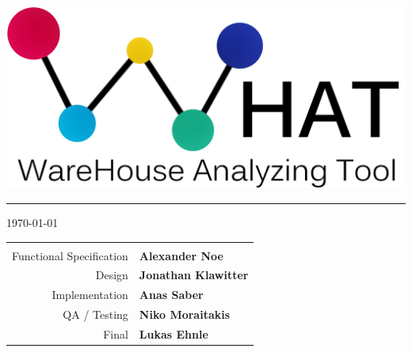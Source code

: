 \begin{titlepage}
\begin{center}
\begin{center}
   \includegraphics[width=0.7\linewidth]{Pictures/WHAT-LogoText2.png}
   
\end{center} 


\vspace*{2.8cm}

{\color{Bittersweet}\hrule}
\vspace*{0.4cm}
 {\today}
 
\vspace*{0.5cm}
\normalsize

 

\begin{tabular}{r l}

\arrayrulecolor{Bittersweet!90}
\hline
& \\
 
  	Functional Specification
&
	\textbf{Alexander Noe}
\\ 
	Design
& 
	\textbf{Jonathan Klawitter}
\\ 
	Implementation 
& 
	\textbf{Anas Saber}
\\
	QA / Testing 
&
	\textbf{Niko Moraitakis}
\\
	Final 
&	\textbf{Lukas Ehnle}\\



 
\end{tabular}


\end{center}
\end{titlepage}